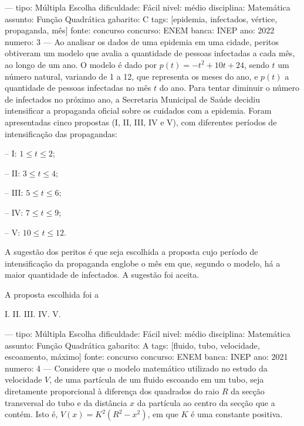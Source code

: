 
---
tipo: Múltipla Escolha
dificuldade: Fácil
nivel: médio
disciplina: Matemática
assunto: Função Quadrática
gabarito: C
tags: [epidemia, infectados, vértice, propaganda, mês]
fonte: concurso
concurso: ENEM
banca: INEP
ano: 2022
numero: 3
---
\question
Ao analisar os dados de uma epidemia em uma cidade, peritos obtiveram um modelo que avalia a quantidade de pessoas infectadas a cada mês, ao longo de um ano. O modelo é dado por \( p(t) = -t^2 + 10t + 24 \), sendo \( t \) um número natural, variando de 1 a 12, que representa os meses do ano, e \( p(t) \) a quantidade de pessoas infectadas no mês \( t \) do ano. Para tentar diminuir o número de infectados no próximo ano, a Secretaria Municipal de Saúde decidiu intensificar a propaganda oficial sobre os cuidados com a epidemia. Foram apresentadas cinco propostas (I, II, III, IV e V), com diferentes períodos de intensificação das propagandas:

-- I: \( 1 \leq t \leq 2 \);

-- II: \( 3 \leq t \leq 4 \);

-- III: \( 5 \leq t \leq 6 \);

-- IV: \( 7 \leq t \leq 9 \);

-- V: \( 10 \leq t \leq 12 \).

A sugestão dos peritos é que seja escolhida a proposta cujo período de intensificação da propaganda englobe o mês em que, segundo o modelo, há a maior quantidade de infectados. A sugestão foi aceita.

A proposta escolhida foi a
\begin{oneparchoices}
\choice I.
\choice II.
\correctchoice III.
\choice IV.
\choice V.
\end{oneparchoices}

---
tipo: Múltipla Escolha
dificuldade: Fácil
nivel: médio
disciplina: Matemática
assunto: Função Quadrática
gabarito: A
tags: [fluido, tubo, velocidade, escoamento, máximo]
fonte: concurso
concurso: ENEM
banca: INEP
ano: 2021
numero: 4
---
\question
Considere que o modelo matemático utilizado no estudo da velocidade \( V \), de uma partícula de um fluido escoando em um tubo, seja diretamente proporcional à diferença dos quadrados do raio \( R \) da secção transversal do tubo e da distância \( x \) da partícula ao centro da secção que a contém. Isto é, \( V(x) = K^2(R^2 - x^2) \), em que \( K \) é uma constante positiva.

